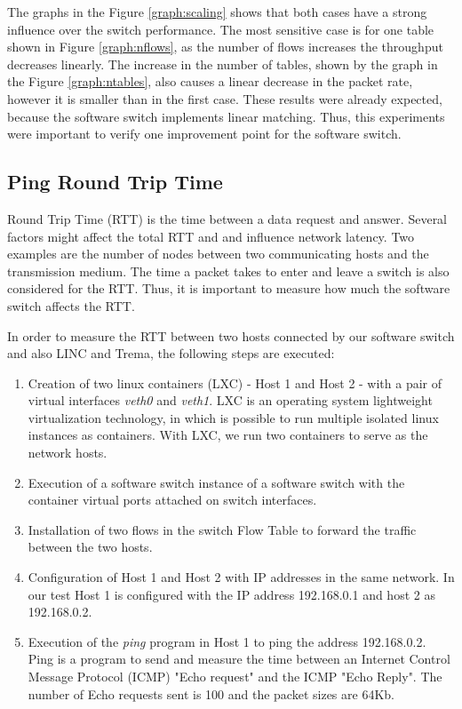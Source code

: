         The graphs in the Figure \ref{graph:scaling} shows that both cases have a strong influence over the switch performance. The most sensitive case is for one table shown in Figure \ref{graph:nflows}, as the number of flows increases the throughput decreases linearly. The increase in the number of tables, shown by the graph in the Figure \ref{graph:ntables}, also causes a linear decrease in the packet rate, however it is smaller than in the first case. These results were already expected, because the software switch implements linear matching. Thus, this experiments were important to verify one improvement point for the software switch.     
     
    \subsection{Ping Round Trip Time}

    Round Trip Time (RTT) is the time between a data request and answer. Several factors might affect the total RTT and and influence network latency. Two examples are the number of nodes between two communicating hosts and the transmission medium. The time a packet takes to enter and leave a switch is also considered for the RTT. Thus, it is important to measure how much the software switch affects the RTT. 
    
    In order to measure the RTT between two hosts connected by our software switch and also LINC and Trema, the following steps are executed:
    
    \begin{enumerate}
    \item Creation of two linux containers (LXC) - Host 1 and Host 2 - with a pair of virtual interfaces \textit{veth0} and \textit{veth1}. LXC is an operating system lightweight virtualization technology, in which is possible to run multiple isolated linux instances as containers. With LXC, we run two containers to serve as the network hosts.    
    \item Execution of a software switch instance of a software switch with the container virtual ports attached on switch interfaces.
    \item Installation of two flows in the switch Flow Table to forward the traffic between the two hosts. 
    \item Configuration of Host 1 and Host 2 with IP addresses in the same network. In our test Host 1 is configured with the IP address 192.168.0.1 and host 2 as 192.168.0.2. 
    \item Execution of the \textit{ping} program in Host 1 to ping the address 192.168.0.2. Ping is a program to send and measure the time between an Internet Control Message Protocol (ICMP) "Echo request" and the ICMP "Echo Reply". The number of Echo requests sent is 100 and the packet sizes are 64Kb.
    \end{enumerate}

